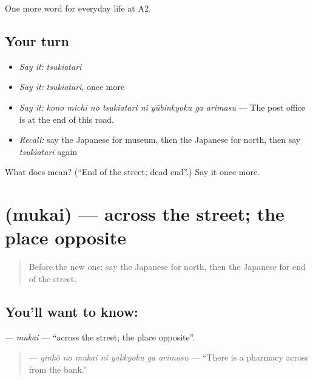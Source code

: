 \begin{grammarlens}[title={What you've built}]
One more word for everyday life at A2.
\end{grammarlens}

\subsection*{Your turn}
\begin{itemize}
\raggedright
  \item \emph{Say it:} \emph{tsukiatari}
  \item \emph{Say it:} \emph{tsukiatari}, once more
  \item \emph{Say it:} \emph{kono michi no tsukiatari ni yūbinkyoku ga arimasu} — The post office is at the end of this road.
  \item \emph{Recall:} say the Japanese for museum, then the Japanese for north, then say \emph{tsukiatari} again
\end{itemize}

\begin{tcolorbox}[breakable,colback=teal!4,colframe=teal!35!black,title={Before you move on}]
What does  mean? (\textquotedblleft{}End of the street; dead end\textquotedblright{}.) Say it once more.
\end{tcolorbox}
\section[\texorpdfstring{\ja{むかい} (mukai)}{むかい (mukai)}]{ (mukai) — across the street; the place opposite}

\label{lesson:JA-C195-mukai}



\begin{quote}
Before the new one: say the Japanese for north, then the Japanese for end of the street.
\end{quote}

\subsection*{You'll want to know: }
\textbf{} — \emph{mukai} — \textquotedblleft{}across the street; the place opposite\textquotedblright{}.

\begin{quote}
\textbf{   } — \emph{ginkō no mukai ni yakkyoku ga arimasu} — \textquotedblleft{}There is a pharmacy across from the bank.\textquotedblright{}
\end{quote}

